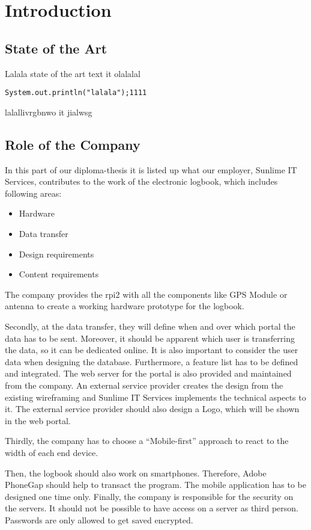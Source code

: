 \newpage
\chapter*{Introduction}
\section*{State of the Art}
Lalala state of the art text \gls{it} olalalal
\begin{verbatim}
System.out.println("lalala");1111
\end{verbatim}
lalallivrgbnwo \gls{it} jialwsg

\newpage
\section*{Role of the Company}
In this part of our diploma-thesis it is listed up what our employer, Sunlime IT Services, contributes to the work of the electronic logbook, which includes following areas:
\begin{itemize}
\item Hardware
\item Data transfer
\item Design requirements
\item Content requirements
\end{itemize}
The company provides the \gls{rpi2} with all the components like GPS Module or antenna to create a working hardware prototype for the logbook.

Secondly, at the data transfer, they will define when and over which portal the data has to be sent. Moreover, it should be apparent which user is transferring the data, so it can be dedicated online. It is also important to consider the user data when designing the database. Furthermore, a feature list has to be defined and integrated.
The web server for the portal is also provided and maintained from the company.
\newline \newline
An external service provider creates the design from the existing wireframing and Sunlime IT Services implements the technical aspects to it. The external service provider should also design a Logo, which will be shown in the web portal.

Thirdly, the company has to choose a “Mobile-first” approach to react to the width of each end device.

Then, the logbook should also work on smartphones. Therefore, Adobe PhoneGap should help to transact the program. The mobile application has to be designed one time only.
\newline \newline
Finally, the company is responsible for the security on the servers. It should not be possible to have access on a server as third person. Passwords are only allowed to get saved encrypted.
\newpage
